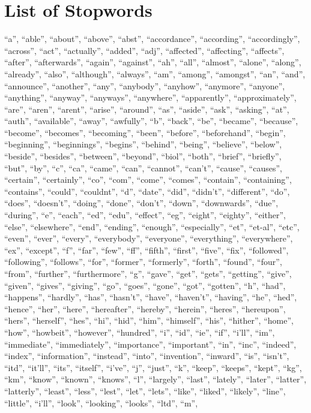 \documentclass[midd]{thesis}
\begin{document}
\chapter{List of Stopwords}
 ``a'', ``able'', ``about'', ``above'', ``abst'', ``accordance'', ``according'', ``accordingly'', ``across'', ``act'', ``actually'', ``added'', ``adj'', ``affected'', ``affecting'', ``affects'', ``after'', ``afterwards'', ``again'', ``against'', ``ah'', ``all'', ``almost'', ``alone'', ``along'', ``already'', ``also'', ``although'', ``always'', ``am'', ``among'', ``amongst'', ``an'', ``and'', ``announce'', ``another'', ``any'', ``anybody'', ``anyhow'', ``anymore'', ``anyone'', ``anything'', ``anyway'', ``anyways'', ``anywhere'', ``apparently'', ``approximately'', ``are'', ``aren'', ``arent'', ``arise'', ``around'', ``as'', ``aside'', ``ask'', ``asking'', ``at'', ``auth'', ``available'', ``away'', ``awfully'', ``b'', ``back'', ``be'', ``became'', ``because'', ``become'', ``becomes'', ``becoming'', ``been'', ``before'', ``beforehand'', ``begin'', ``beginning'', ``beginnings'', ``begins'', ``behind'', ``being'', ``believe'', ``below'', ``beside'', ``besides'', ``between'', ``beyond'', ``biol'', ``both'', ``brief'', ``briefly'', ``but'', ``by'', ``c'', ``ca'', ``came'', ``can'', ``cannot'', ``can't'', ``cause'', ``causes'', ``certain'', ``certainly'', ``co'', ``com'', ``come'', ``comes'', ``contain'', ``containing'', ``contains'', ``could'', ``couldnt'', ``d'', ``date'', ``did'', ``didn't'', ``different'', ``do'', ``does'', ``doesn't'', ``doing'', ``done'', ``don't'', ``down'', ``downwards'', ``due'', ``during'', ``e'', ``each'', ``ed'', ``edu'', ``effect'', ``eg'', ``eight'', ``eighty'', ``either'', ``else'', ``elsewhere'', ``end'', ``ending'', ``enough'', ``especially'', ``et'', ``et-al'', ``etc'', ``even'', ``ever'', ``every'', ``everybody'', ``everyone'', ``everything'', ``everywhere'', ``ex'', ``except'', ``f'', ``far'', ``few'', ``ff'', ``fifth'', ``first'', ``five'', ``fix'', ``followed'', ``following'', ``follows'', ``for'', ``former'', ``formerly'', ``forth'', ``found'', ``four'', ``from'', ``further'', ``furthermore'', ``g'', ``gave'', ``get'', ``gets'', ``getting'', ``give'', ``given'', ``gives'', ``giving'', ``go'', ``goes'', ``gone'', ``got'', ``gotten'', ``h'', ``had'', ``happens'', ``hardly'', ``has'', ``hasn't'', ``have'', ``haven't'', ``having'', ``he'', ``hed'', ``hence'', ``her'', ``here'', ``hereafter'', ``hereby'', ``herein'', ``heres'', ``hereupon'', ``hers'', ``herself'', ``hes'', ``hi'', ``hid'', ``him'', ``himself'', ``his'', ``hither'', ``home'', ``how'', ``howbeit'', ``however'', ``hundred'', ``i'', ``id'', ``ie'', ``if'', ``i'll'', ``im'', ``immediate'', ``immediately'', ``importance'', ``important'', ``in'', ``inc'', ``indeed'', ``index'', ``information'', ``instead'', ``into'', ``invention'', ``inward'', ``is'', ``isn't'', ``itd'', ``it'll'', ``its'', ``itself'', ``i've'', ``j'', ``just'', ``k'', ``keep'', ``keeps'', ``kept'', ``kg'', ``km'', ``know'', ``known'', ``knows'', ``l'', ``largely'', ``last'', ``lately'', ``later'', ``latter'', ``latterly'', ``least'', ``less'', ``lest'', ``let'', ``lets'', ``like'', ``liked'', ``likely'', ``line'', ``little'', ``i'll'', ``look'', ``looking'', ``looks'', ``ltd'', ``m'', 
\end{document}
